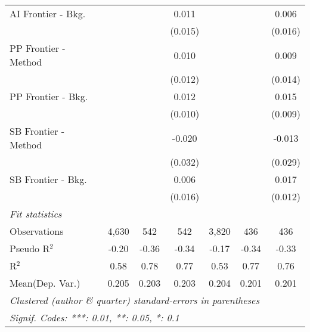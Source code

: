 \begin{tabular}{lcccccc}
   AI Frontier - Bkg.   &               &               & 0.011       &               &               & 0.006\\   
                        &               &               & (0.015)     &               &               & (0.016)\\   
   PP Frontier - Method &               &               & 0.010       &               &               & 0.009\\   
                        &               &               & (0.012)     &               &               & (0.014)\\   
   PP Frontier - Bkg.   &               &               & 0.012       &               &               & 0.015\\   
                        &               &               & (0.010)     &               &               & (0.009)\\   
   SB Frontier - Method &               &               & -0.020      &               &               & -0.013\\   
                        &               &               & (0.032)     &               &               & (0.029)\\   
   SB Frontier - Bkg.   &               &               & 0.006       &               &               & 0.017\\   
                        &               &               & (0.016)     &               &               & (0.012)\\   
   \midrule
   \emph{Fit statistics}\\
   Observations         & 4,630         & 542           & 542         & 3,820         & 436           & 436\\  
   Pseudo R$^2$         & -0.20         & -0.36         & -0.34       & -0.17         & -0.34         & -0.33\\  
   R$^2$                & 0.58          & 0.78          & 0.77        & 0.53          & 0.77          & 0.76\\  
Mean(Dep. Var.) & 0.205 & 0.203 & 0.203 & 0.204 & 0.201 & 0.201 \\
   \midrule \midrule
   \multicolumn{7}{l}{\emph{Clustered (author \& quarter) standard-errors in parentheses}}\\
   \multicolumn{7}{l}{\emph{Signif. Codes: ***: 0.01, **: 0.05, *: 0.1}}\\
\end{tabular}
\par\endgroup
